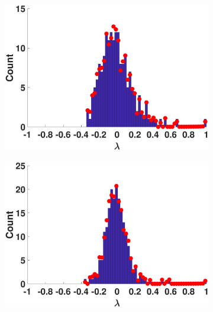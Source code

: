 \begin{figure}[ht]
\begin{subfigure}[t]{0.19\textwidth}
    \includegraphics[width=\textwidth,trim = .4cm 0.5cm 3.5cm 1.3cm,clip]
    {./ndos/pics/hp}
    \label{fig:hp_dos}
  \end{subfigure}
  \begin{subfigure}[t]{0.19\textwidth}
    \centering  
    \captionsetup{justification=centering,font=scriptsize}
    \includegraphics[width=\textwidth,trim = .4cm 0.5cm 3.5cm 1.3cm,clip]
    {./ndos/pics/twitter}
    \label{fig:twitter_dos}
  \end{subfigure}
  \begin{subfigure}[t]{0.19\textwidth}
    \centering  
    \captionsetup{justification=centering,font=scriptsize}

\end{subfigure}
\end{figure}
